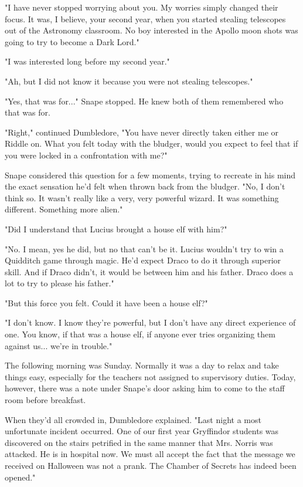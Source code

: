 \documentclass[a4paper,11pt]{article}
\begin{document}
"I have never stopped worrying about you. My worries simply changed their focus. It was, I believe, your second year, when you started stealing telescopes out of the Astronomy classroom. No boy interested in the Apollo moon shots was going to try to become a Dark Lord."

"I was interested long before my second year."

"Ah, but I did not know it because you were not stealing telescopes."

"Yes, that was for..." Snape stopped. He knew both of them remembered who that was for.

"Right," continued Dumbledore, "You have never directly taken either me or Riddle on. What you felt today with the bludger, would you expect to feel that if you were locked in a confrontation with me?"

Snape considered this question for a few moments, trying to recreate in his mind the exact sensation he'd felt when thrown back from the bludger. "No, I don't think so. It wasn't really like a very, very powerful wizard. It was something different. Something more alien."

"Did I understand that Lucius brought a house elf with him?"

"No. I mean, yes he did, but no that can't be it. Lucius wouldn't try to win a Quidditch game through magic. He'd expect Draco to do it through superior skill. And if Draco didn't, it would be between him and his father. Draco does a lot to try to please his father."

"But this force you felt. Could it have been a house elf?"

"I don't know. I know they're powerful, but I don't have any direct experience of one. You know, if that was a house elf, if anyone ever tries organizing them against us... we're in trouble."

The following morning was Sunday. Normally it was a day to relax and take things easy, especially for the teachers not assigned to supervisory duties. Today, however, there was a note under Snape's door asking him to come to the staff room before breakfast.

When they'd all crowded in, Dumbledore explained. "Last night a most unfortunate incident occurred. One of our first year Gryffindor students was discovered on the stairs petrified in the same manner that Mrs. Norris was attacked. He is in hospital now. We must all accept the fact that the message we received on Halloween was not a prank. The Chamber of Secrets has indeed been opened."
\end{document}
